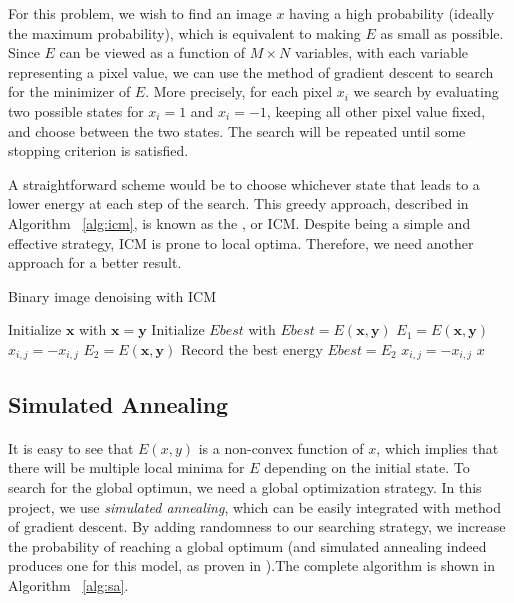 \documentclass{article}
\begin{document}
For this problem, we wish to find an image $x$ having a high probability (ideally the maximum probability), which is equivalent to making $E$ as small as possible. Since $E$ can be viewed as a function of $M \times N$ variables, with each variable representing a pixel value, we can use the method of gradient descent to search for the minimizer of $E$. More precisely, for each pixel $x_{i}$ we search by evaluating two possible states for $x_{i} = 1$ and $x_{i} = −1$, keeping all other pixel value fixed, and choose between the two states. The search will be repeated until some stopping criterion is satisfied.

A straightforward scheme would be to choose whichever state that leads to a lower energy at each step of the search. This greedy approach, described in Algorithm ~\ref{alg:icm}, is known as the , or ICM. Despite being a simple and effective strategy, ICM is prone to local optima. Therefore, we need another approach for a better result.

\begin{algorithm}
\centering
\caption{Binary image denoising with ICM}
\label{alg:icm}
  \begin{algorithmic}[1]
        \State Initialize $\mathbf{x}$ with $\mathbf{x} = \mathbf{y}$
        \State Initialize $Ebest$ with $Ebest = E(\mathbf{x}, \mathbf{y})$
	    		\State $E_1 = E(\mathbf{x}, \mathbf{y})$
	    		\State $x_{i,j} = - x_{i,j}$ 
	    		\State $E_2 = E(\mathbf{x}, \mathbf{y})$
		    			\State Record the best energy $Ebest = E_2$
		    		\EndIf
		    	\Else
		    		\State $x_{i,j} = - x_{i,j}$ 
		    	\EndIf
	    	\EndFor
	    \EndFor
      \Return $x$
    \EndFunction
  \end{algorithmic}
\end{algorithm}

\subsection{Simulated Annealing}
\paragraph{}
It is easy to see that $E(x,y)$ is a non-convex function of $x$, which implies that there will be multiple local minima for $E$ depending on the initial state. To search for the global optimun, we need a global optimization strategy. In this project, we use \textit{simulated annealing}, which can be easily integrated with method of gradient descent. By adding randomness to our searching strategy, we increase the probability of reaching a global optimum (and simulated annealing indeed produces one for this model, as proven in \cite{geman1984stochastic}).The complete algorithm is shown in Algorithm ~\ref{alg:sa}.
\end{document}
